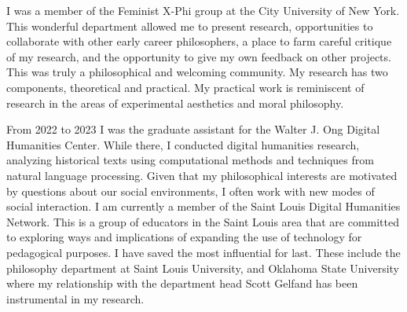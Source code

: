 \documentclass[phdthesis,12pt,final]{wuthesis}
\theoremstyle{definition}
\theoremstyle{definition}
\theoremstyle{definition}
\theoremstyle{definition}
\theoremstyle{remark}
\begin{document}
\begin{thesisacknowledgments}
I was a member of the Feminist X-Phi group at the City University of New York. This wonderful department allowed me to present research, opportunities to collaborate with other early career philosophers, a place to farm careful critique of my research, and the opportunity to give my own feedback on other projects. This was truly a philosophical and welcoming community. My research has two components, theoretical and practical. My practical work is reminiscent of research in the areas of experimental aesthetics and moral philosophy.

From 2022 to 2023 I was the graduate assistant for the Walter J. Ong Digital Humanities Center. While there, I conducted digital humanities research, analyzing historical texts using computational methods and techniques from natural language processing. Given that my philosophical interests are motivated by questions about our social environments, I often work with new modes of social interaction. I am currently a member of the Saint Louis Digital Humanities Network. This is a group of educators in the Saint Louis area that are committed to exploring ways and implications of expanding the use of technology for pedagogical purposes. I have saved the most influential for last. These include the philosophy department at Saint Louis University, and Oklahoma State University where my relationship with the department head Scott Gelfand has been instrumental in my research.
\end{thesisacknowledgments}

\cleardoublepage
\begin{singlespace}
\setcounter{page}{2}
\renewcommand*\contentsname{Table of Contents}
\tableofcontents
\end{singlespace}


\end{document}

